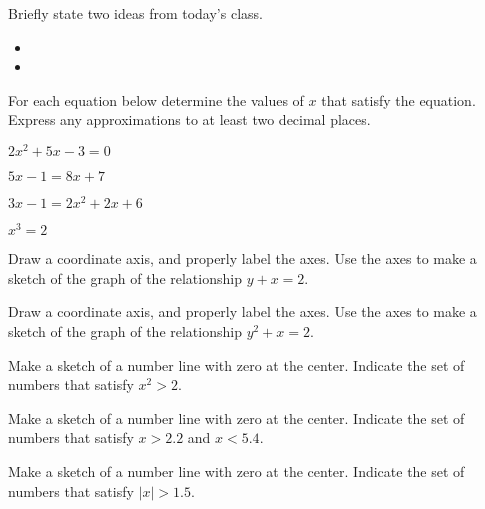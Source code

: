 \begin{problem}
\item Briefly state two ideas from today's class.
  \begin{itemize}
  \item
  \item
  \end{itemize}
\item For each equation below determine the values of $x$ that satisfy
  the equation. Express any approximations to at least two decimal
  places.
  \begin{subproblem}
    \item $2x^2 + 5x - 3 = 0$
    \item $5x-1=8x+7$
    \item $3x - 1 = 2x^2 + 2x + 6$
    \item $x^3 = 2$
  \end{subproblem}
\item Draw a coordinate axis, and properly label the axes. Use the
  axes to make a sketch of the graph of the relationship $y+x=2$.
\item Draw a coordinate axis, and properly label the axes. Use the
  axes to make a sketch of the graph of the relationship $y^2+x=2$.
\item Make a sketch of a number line with zero at the center.
  Indicate the set of numbers that satisfy $x^2>2$.
\item Make a sketch of a number line with zero at the center.
  Indicate the set of numbers that satisfy $x>2.2$ and $x<5.4$.
\item Make a sketch of a number line with zero at the center.
  Indicate the set of numbers that satisfy $|x|>1.5$.
\end{problem}
